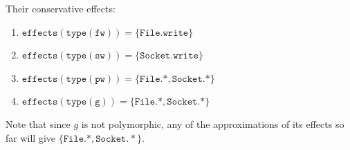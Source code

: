 \documentclass{llncs}
\newcommand{\keywadj}[1]{\mathtt{#1}}
\newcommand{\kwa}[1]{\keywadj{ #1 }}
\begin{document}
\noindent
Their conservative effects:

\begin{enumerate}
	\item $\kwa{effects(type(fw)) = \{File.write\}}$
	\item $\kwa{effects(type(sw)) = \{Socket.write\}}$
	\item $\kwa{effects(type(pw)) = \{File.*, Socket.*\}}$
	\item $\kwa{effects(type(g)) = \{File.*, Socket.*\}}$
\end{enumerate}

\noindent
Note that since $g$ is not polymorphic, any of the approximations of its effects so far will give $\{ \kwa{File.*, Socket.*} \}$.
\end{document}
